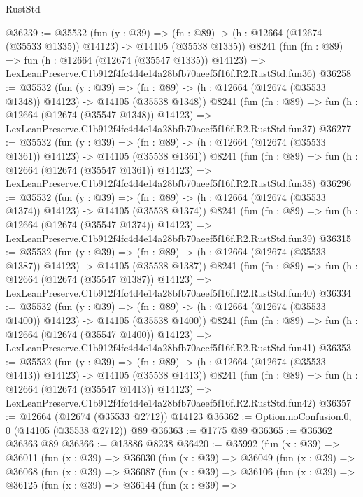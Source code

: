 \begin{lexlean}{RustStd}
\begin{coremodule}
@36239 := @35532
    (fun (y : @39) =>
    (fn : @89) -> (h : @12664 (@12674 (@35533 @1335)) @14123) -> @14105 (@35538 @1335))
    @8241
    (fun (fn : @89) =>
    fun (h : @12664 (@12674 (@35547 @1335)) @14123) =>
    LexLeanPreserve.C1b912f4fc4d4e14a28bfb70aeef5f16f.R2.RustStd.fun36)
@36258 := @35532
    (fun (y : @39) =>
    (fn : @89) -> (h : @12664 (@12674 (@35533 @1348)) @14123) -> @14105 (@35538 @1348))
    @8241
    (fun (fn : @89) =>
    fun (h : @12664 (@12674 (@35547 @1348)) @14123) =>
    LexLeanPreserve.C1b912f4fc4d4e14a28bfb70aeef5f16f.R2.RustStd.fun37)
@36277 := @35532
    (fun (y : @39) =>
    (fn : @89) -> (h : @12664 (@12674 (@35533 @1361)) @14123) -> @14105 (@35538 @1361))
    @8241
    (fun (fn : @89) =>
    fun (h : @12664 (@12674 (@35547 @1361)) @14123) =>
    LexLeanPreserve.C1b912f4fc4d4e14a28bfb70aeef5f16f.R2.RustStd.fun38)
@36296 := @35532
    (fun (y : @39) =>
    (fn : @89) -> (h : @12664 (@12674 (@35533 @1374)) @14123) -> @14105 (@35538 @1374))
    @8241
    (fun (fn : @89) =>
    fun (h : @12664 (@12674 (@35547 @1374)) @14123) =>
    LexLeanPreserve.C1b912f4fc4d4e14a28bfb70aeef5f16f.R2.RustStd.fun39)
@36315 := @35532
    (fun (y : @39) =>
    (fn : @89) -> (h : @12664 (@12674 (@35533 @1387)) @14123) -> @14105 (@35538 @1387))
    @8241
    (fun (fn : @89) =>
    fun (h : @12664 (@12674 (@35547 @1387)) @14123) =>
    LexLeanPreserve.C1b912f4fc4d4e14a28bfb70aeef5f16f.R2.RustStd.fun40)
@36334 := @35532
    (fun (y : @39) =>
    (fn : @89) -> (h : @12664 (@12674 (@35533 @1400)) @14123) -> @14105 (@35538 @1400))
    @8241
    (fun (fn : @89) =>
    fun (h : @12664 (@12674 (@35547 @1400)) @14123) =>
    LexLeanPreserve.C1b912f4fc4d4e14a28bfb70aeef5f16f.R2.RustStd.fun41)
@36353 := @35532
    (fun (y : @39) =>
    (fn : @89) -> (h : @12664 (@12674 (@35533 @1413)) @14123) -> @14105 (@35538 @1413))
    @8241
    (fun (fn : @89) =>
    fun (h : @12664 (@12674 (@35547 @1413)) @14123) =>
    LexLeanPreserve.C1b912f4fc4d4e14a28bfb70aeef5f16f.R2.RustStd.fun42)
@36357 := @12664 (@12674 (@35533 @2712)) @14123
@36362 := Option.noConfusion.{0, 0} (@14105 (@35538 @2712)) @89
@36363 := @1775 @89
@36365 := @36362 @36363 @89
@36366 := @13886 @8238
@36420 := @35992
    (fun (x : @39) =>
    @36011
      (fun (x : @39) =>
      @36030
        (fun (x : @39) =>
        @36049
          (fun (x : @39) =>
          @36068
            (fun (x : @39) =>
            @36087
              (fun (x : @39) =>
              @36106
                (fun (x : @39) =>
                @36125
                  (fun (x : @39) =>
                  @36144
                    (fun (x : @39) =>

\end{coremodule}
\end{lexlean}
